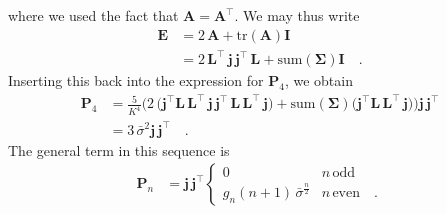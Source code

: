 \documentclass[modern]{aastex62}
\begin{document}
    where we used the fact that $\mathbf{A} = \mathbf{A}^\top$. We may thus write
    \begin{align}
        \mathbf{E} & =
        2 \, \mathbf{A} + \mathrm{tr}(\mathbf{A}) \mathbf{I}
        \nonumber      \\
                   & =
        2 \, \mathbf{L}^\top \, \mathbf{j} \, \mathbf{j}^\top \, \mathbf{L} + \mathrm{sum}(\pmb{\Sigma}) \mathbf{I}
        \quad.
    \end{align}
    Inserting this back into the expression for $\mathbf{P}_4$, we obtain
    \begin{align}
        \mathbf{P}_4 & =
        \frac{5}{K^4}
        \bigg(
        2 \, \big(\mathbf{j}^\top \mathbf{L} \, \mathbf{L}^\top \, \mathbf{j} \, \mathbf{j}^\top \, \mathbf{L} \, \mathbf{L}^\top \, \mathbf{j} \big)
        +
        \mathrm{sum}(\pmb{\Sigma}) \big(\mathbf{j}^\top \mathbf{L} \, \mathbf{L}^\top \, \mathbf{j} \big)
        \bigg) \mathbf{j} \, \mathbf{j}^\top
        \nonumber        \\
                     & =
        3 \, \bar{\sigma}^2 \mathbf{j} \, \mathbf{j}^\top
        \quad.
    \end{align}
    The general term in this sequence is
    \begin{align}
        \mathbf{P}_n & =
        \mathbf{j} \, \mathbf{j}^\top
        \begin{cases}
            0                                       & n \, \mathrm{odd}
            \\
            g_n (n + 1) \, \bar{\sigma}^\frac{n}{2} & n \, \mathrm{even}
            \quad.
        \end{cases}
    \end{align}
\end{document}

